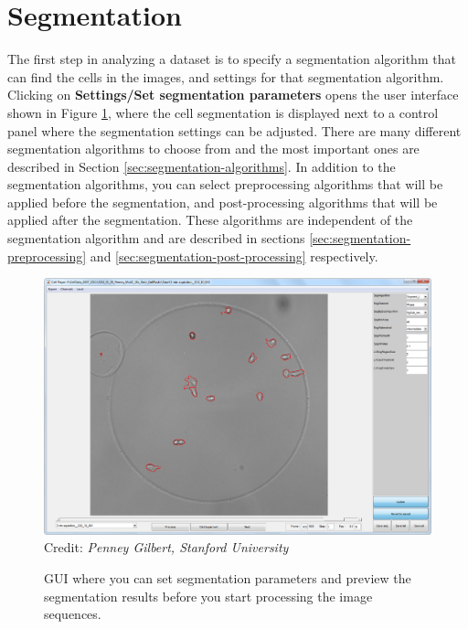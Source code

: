 \documentclass[a4paper, oneside, onecolumn, 11pt]{article}
\newcommand{\menu}[1]{\textbf{#1}}
\newcommand{\credit}[1]{\raggedleft \scriptsize Credit:\emph{ #1}}
\begin{document}
\section{Segmentation}
The first step in analyzing a dataset is to specify a segmentation algorithm that can find the cells in the images, and settings for that segmentation algorithm. Clicking on \menu{Settings/\allowbreak Set segmentation parameters} opens the user interface shown in Figure \ref{fig:segmentation-GUI}, where the cell segmentation is displayed next to a control panel where the segmentation settings can be adjusted. There are many different segmentation algorithms to choose from and the most important ones are described in Section \ref{sec:segmentation-algorithms}. In addition to the segmentation algorithms, you can select preprocessing algorithms that will be applied before the segmentation, and post-processing algorithms that will be applied after the segmentation. These algorithms are independent of the segmentation algorithm and are described in sections \ref{sec:segmentation-preprocessing} and \ref{sec:segmentation-post-processing} respectively.

\begin{figure}[!htb]
\begin{center}
\includegraphics[width = \columnwidth]{figures/segmentationGUI}
\credit{Penney Gilbert, Stanford University}
\caption{GUI where you can set segmentation parameters and preview the segmentation results before you start processing the image sequences.}
\label{fig:segmentation-GUI}
\end{center}
\end{figure}
\end{document}
